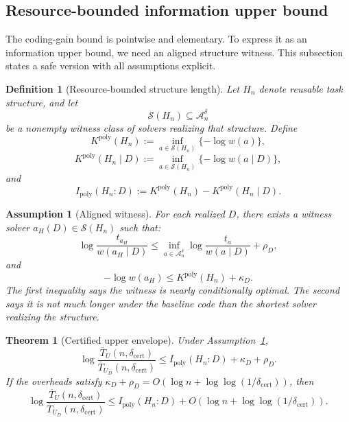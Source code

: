 \documentclass{article}
\newtheorem{assumption}{Assumption}
\newtheorem{definition}{Definition}
\newtheorem{theorem}{Theorem}
\newcommand{\cA}{\mathcal{A}}
\newcommand{\cS}{\mathcal{S}}
\begin{document}
\subsection{Resource-bounded information upper bound}

The coding-gain bound is pointwise and elementary.
To express it as an information upper bound, we need an aligned structure witness.
This subsection states a safe version with all assumptions explicit.

\begin{definition}[Resource-bounded structure length]
\label{def:app-ipoly}
Let \(H_n\) denote reusable task structure, and let
\[
    \cS(H_n)\subseteq\cA_n^\delta
\]
be a nonempty witness class of solvers realizing that structure.
Define
\[
    K^{\mathrm{poly}}(H_n)
    :=
    \inf_{a\in\cS(H_n)}\{-\log w(a)\},
\]
\[
    K^{\mathrm{poly}}(H_n\mid D)
    :=
    \inf_{a\in\cS(H_n)}\{-\log w(a\mid D)\},
\]
and
\[
    I_{\mathrm{poly}}(H_n:D)
    :=
    K^{\mathrm{poly}}(H_n)
    -
    K^{\mathrm{poly}}(H_n\mid D).
\]
\end{definition}

\begin{assumption}[Aligned witness]
\label{ass:app-aligned-witness}
For each realized \(D\), there exists a witness solver \(a_H(D)\in\cS(H_n)\) such that:
\[
    \log\frac{t_{a_H}}{w(a_H\mid D)}
    \le
    \inf_{a\in\cA_n^\delta}
    \log\frac{t_a}{w(a\mid D)}
    +
    \rho_D ,
\]
and
\[
    -\log w(a_H)
    \le
    K^{\mathrm{poly}}(H_n)+\kappa_D .
\]
The first inequality says the witness is nearly conditionally optimal.
The second says it is not much longer under the baseline code than the shortest solver
realizing the structure.
\end{assumption}

\begin{theorem}[Certified upper envelope]
\label{thm:app-certified-upper-envelope}
Under Assumption~\ref{ass:app-aligned-witness},
\[
    \log\frac{\overline T_U(n,\delta_{\mathrm{cert}})}
             {\overline T_{U_D}(n,\delta_{\mathrm{cert}})}
    \le
    I_{\mathrm{poly}}(H_n:D)+\kappa_D+\rho_D .
\]
If the overheads satisfy \(\kappa_D+\rho_D=O(\log n+\log\log(1/\delta_{\mathrm{cert}}))\),
then
\[
    \log\frac{\overline T_U(n,\delta_{\mathrm{cert}})}
             {\overline T_{U_D}(n,\delta_{\mathrm{cert}})}
    \le
    I_{\mathrm{poly}}(H_n:D)
    +
    O(\log n+\log\log(1/\delta_{\mathrm{cert}})).
\]
\end{theorem}
\end{document}
